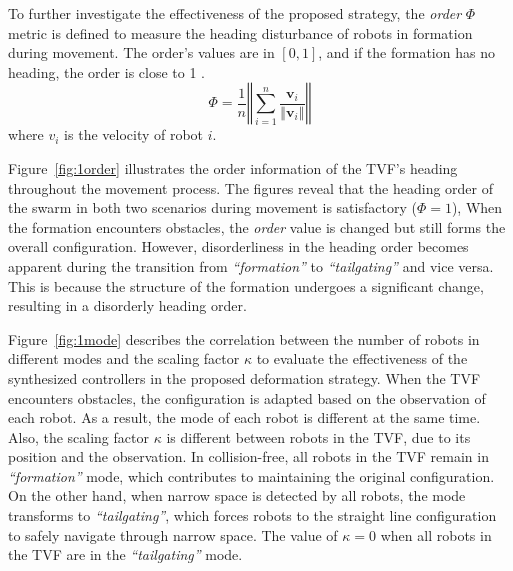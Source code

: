 To further investigate the effectiveness of the proposed strategy, the \textit{order} $\Phi$ metric is defined to measure the heading disturbance of robots in formation during movement. The order's values are in $\left[0,1\right]$, and if the formation has no heading, the order is close to 1 \cite{Vicsek1995}.
\begin{equation}
    \Phi=\dfrac{1}{n}\left\Vert\sum_{i=1}^n{\dfrac{\mathbf{v}_i}{\left\Vert \mathbf{v}_i\right\Vert}}\right\Vert
\end{equation}
where $v_i$ is the velocity of robot $i$.

Figure~\ref{fig:1order} illustrates the order information of the TVF's heading throughout the movement process. The figures reveal that the heading order of the swarm in both two scenarios during movement is satisfactory ($\Phi = 1$), When the formation encounters obstacles, the \textit{order} value is changed but still forms the overall configuration. However, disorderliness in the heading order becomes apparent during the transition from \textit{``formation''} to \textit{``tailgating''} and vice versa. This is because the structure of the formation undergoes a significant change, resulting in a disorderly heading order.

Figure~\ref{fig:1mode} describes the correlation between the number of robots in different modes and the scaling factor $\kappa$ to evaluate the effectiveness of the synthesized controllers in the proposed deformation strategy. When the TVF encounters obstacles, the configuration is adapted based on the observation of each robot. As a result, the mode of each robot is different at the same time. Also, the scaling factor $\kappa$ is different between robots in the TVF, due to its position and the observation. In collision-free, all robots in the TVF remain in \textit{``formation''} mode, which contributes to maintaining the original configuration. On the other hand, when narrow space is detected by all robots, the mode transforms to \textit{``tailgating''}, which forces robots to the straight line configuration to safely navigate through narrow space. The value of $\kappa=0$ when all robots in the TVF are in the \textit{``tailgating''} mode.

